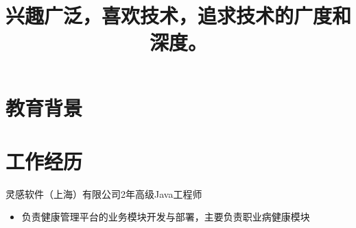 \documentclass[11pt,a4paper,sans]{moderncv} %
\title{兴趣广泛，喜欢技术，追求技术的广度和深度。   }
\begin{document}


%
%
%
%
%



\makecvtitle %

\section{教育背景}


\section{工作经历}
 {灵感软件（上海）有限公司}{2年}{高级Java工程师}{}{
\begin{itemize}
    \item 负责健康管理平台的业务模块开发与部署，主要负责职业病健康模块
\end{itemize}
}
\end{document}
